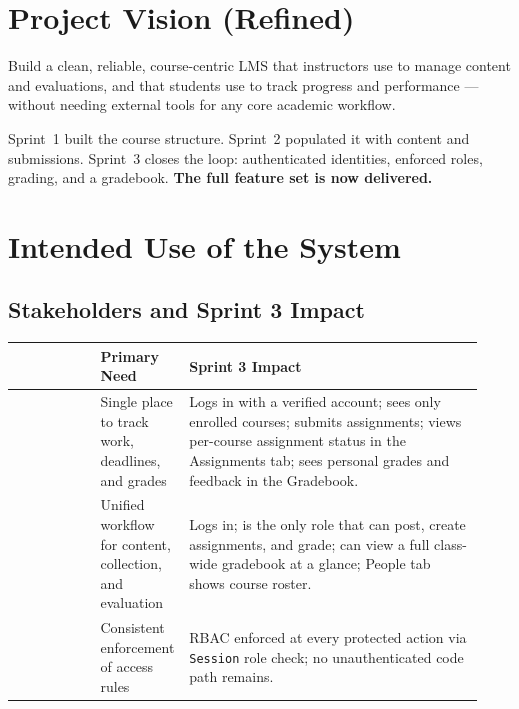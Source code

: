 \documentclass[12pt, a4paper]{article}
\newcommand{\fcol}[1]{\textbf{\color{primary}{#1}}}
\begin{document}
\section{Project Vision (Refined)}

Build a clean, reliable, course-centric LMS that instructors use to manage
content and evaluations, and that students use to track progress and
performance --- without needing external tools for any core academic workflow.

\medskip
\noindent Sprint~1 built the course structure. Sprint~2 populated it with
content and submissions. Sprint~3 closes the loop: authenticated identities,
enforced roles, grading, and a gradebook. \textbf{The full feature set is now
delivered.}

\section{Intended Use of the System}

\subsection{Stakeholders and Sprint 3 Impact}

\begin{center}
\begin{tabular}{@{}p{0.18\linewidth}p{0.13\linewidth}p{0.62\linewidth}@{}}
  \toprule
  \fcol{Stakeholder} & Primary Need & Sprint 3 Impact \\
  \midrule
  \fcol{Student} & Single place to track work, deadlines, and grades  & Logs in with a verified account; sees only enrolled courses; submits assignments; views per-course assignment status in the Assignments tab; sees personal grades and feedback in the Gradebook. \\
\fcol{Instructor} & Unified workflow for content, collection, and evaluation & Logs in; is the only role that can post, create assignments, and grade; can view a full class-wide gradebook at a glance; People tab shows course roster. \\
  \fcol{System} & Consistent enforcement of access rules             & RBAC enforced at every protected action via \texttt{Session} role check; no unauthenticated code path remains. \\
  \bottomrule
\end{tabular}
\end{center}
\end{document}
